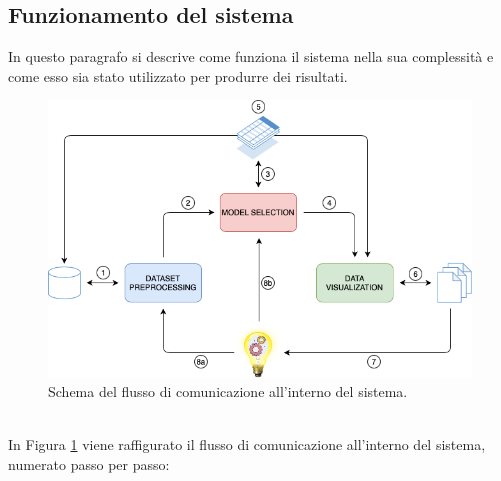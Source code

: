 \documentclass[12pt]{report}
\theoremstyle{definition}
\begin{document}
\subsection{Funzionamento del sistema}
In questo paragrafo si descrive come funziona il sistema nella sua complessità e come esso sia stato utilizzato per produrre dei risultati.
\begin{figure}[!ht]
    \centering
    \includegraphics[scale=0.6]{images/cycle.png}
    \caption{Schema del flusso di comunicazione all'interno del sistema.}
    \label{cycle}
\end{figure}
\\
In Figura \ref{cycle} viene raffigurato il flusso di comunicazione all'interno del sistema, numerato passo per passo: 
\end{document}

